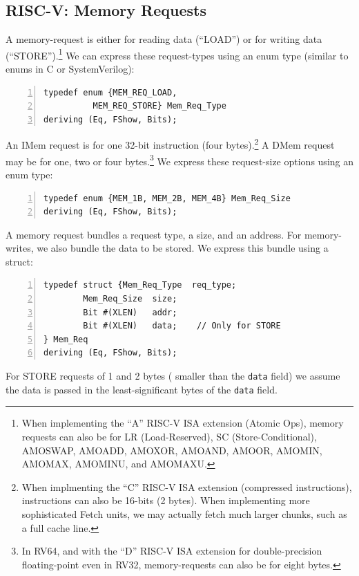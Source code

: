 
\subsection{RISC-V: Memory Requests}


A memory-request is either for reading data (``LOAD'') or for writing
data (``STORE'').\footnote{When implementing the ``A'' RISC-V ISA
extension (Atomic Ops), memory requests can also be for LR
(Load-Reserved), SC (Store-Conditional), AMOSWAP, AMOADD, AMOXOR,
AMOAND, AMOOR, AMOMIN, AMOMAX, AMOMINU, and AMOMAXU.}  We can express
these request-types using an enum type (similar to enums in C or
SystemVerilog):

\begin{Verbatim}[frame=single, numbers=left]
typedef enum {MEM_REQ_LOAD,
	      MEM_REQ_STORE} Mem_Req_Type
deriving (Eq, FShow, Bits);
\end{Verbatim}

An IMem request is for one 32-bit instruction (four
bytes).\footnote{When implmenting the ``C'' RISC-V ISA extension
(compressed instructions), instructions can also be 16-bits (2 bytes).
When implementing more sophisticated Fetch units, we may actually
fetch much larger chunks, such as a full cache line.}  A DMem request
may be for one, two or four bytes.\footnote{In RV64, and with the
``D'' RISC-V ISA extension for double-precision floating-point even in
RV32, memory-requests can also be for eight bytes.}  We express these
request-size options using an enum type:

\begin{Verbatim}[frame=single, numbers=left]
typedef enum {MEM_1B, MEM_2B, MEM_4B} Mem_Req_Size
deriving (Eq, FShow, Bits);
\end{Verbatim}

A memory request bundles a request type, a size, and an address.  For
memory-writes, we also bundle the data to be stored.  We express this
bundle using a struct:

\begin{Verbatim}[frame=single, numbers=left]
typedef struct {Mem_Req_Type  req_type;
		Mem_Req_Size  size;
		Bit #(XLEN)   addr;
		Bit #(XLEN)   data;    // Only for STORE
} Mem_Req
deriving (Eq, FShow, Bits);
\end{Verbatim}

For STORE requests of 1 and 2 bytes ({\ie} smaller than the \verb|data|
field) we assume the data is passed in the least-significant bytes of
the \verb|data| field.

